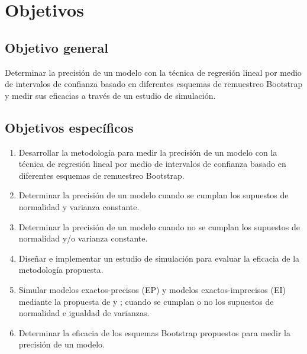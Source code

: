 \section{Objetivos}
\subsection{Objetivo general}
Determinar la precisión de un modelo con la técnica de regresión lineal por medio de intervalos de confianza basado en diferentes esquemas de remuestreo Bootstrap y medir sus eficacias a través de un estudio de simulación.
\vspace{.5cm}
\subsection{Objetivos específicos}
\begin{enumerate}
\item Desarrollar la metodología para medir la precisión de un modelo con la técnica de regresión lineal por medio de intervalos de confianza basado en diferentes esquemas de remuestreo Bootstrap.
\item Determinar la precisión de un modelo cuando se cumplan los supuestos de normalidad y varianza constante.
\item Determinar la precisión de un modelo cuando no se cumplan los supuestos de normalidad y/o varianza constante.
\item Diseñar e implementar un estudio de simulación para evaluar la eficacia de la metodología propuesta.
\item Simular modelos exactos-precisos (EP) y modelos exactos-imprecisos (EI) mediante la propuesta de \textcite{febles-2014} y \textcite{zacarias-2023}; cuando se cumplan o no los supuestos de normalidad e igualdad de varianzas.
\item Determinar la eficacia de los esquemas Bootstrap propuestos para medir la precisión de un modelo.
\end{enumerate}
